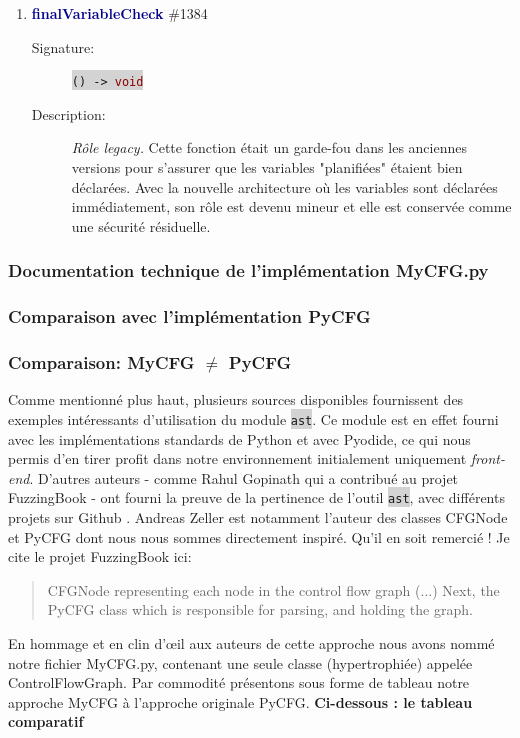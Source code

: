 \documentclass[11pt,a4paper]{article}
\newcommand{\code}[1]{\colorbox{lightgray}{\texttt{\small #1}}}
\newcommand{\methodname}[1]{\textbf{\textcolor{darkblue}{#1}}}
\newcommand{\rettype}[1]{\textcolor{darkred}{#1}}
\begin{document}
\begin{enumerate}
    \item \methodname{finalVariableCheck} \#1384
    \begin{description}
        \item[Signature:] \code{() -> \rettype{void}}
        \item[Description:] \textit{Rôle legacy.} Cette fonction était un garde-fou dans les anciennes versions pour s'assurer que les variables "planifiées" étaient bien déclarées. Avec la nouvelle architecture où les variables sont déclarées immédiatement, son rôle est devenu mineur et elle est conservée comme une sécurité résiduelle.
    \end{description}
    
\end{enumerate}

\subsubsection{Documentation technique de l'implémentation MyCFG.py}

\subsubsection*{Comparaison avec l'implémentation PyCFG}


\subsubsection{Comparaison: \texorpdfstring{MyCFG $\neq$ PyCFG}{MyCFG != PyCFG}}

Comme mentionné plus haut, plusieurs sources disponibles fournissent des exemples intéressants d'utilisation du module \code{ast}. Ce module est en effet fourni avec les implémentations standards de Python et avec Pyodide, ce qui nous permis d'en tirer profit dans notre environnement initialement uniquement \textit{front-end}. D'autres auteurs - comme Rahul Gopinath qui a contribué au projet FuzzingBook - ont fourni la preuve de la pertinence de l'outil \code{ast}, avec différents projets sur Github \cite{rahulgopinath}.
Andreas Zeller est notamment l'auteur des classes CFGNode et PyCFG dont nous nous sommes directement inspiré. Qu'il en soit remercié ! Je cite le projet FuzzingBook ici:
\begin{quote}
    CFGNode representing each node in the control flow graph (...) Next, the PyCFG class which is responsible for parsing, and holding the graph.
\end{quote}
En hommage et en clin d'œil aux auteurs de cette approche nous avons nommé notre fichier MyCFG.py, contenant une seule classe (hypertrophiée) appelée ControlFlowGraph. Par commodité présentons sous forme de tableau notre approche MyCFG à l'approche originale PyCFG.
\noindent\textbf{Ci-dessous : le tableau comparatif}
\end{document}
